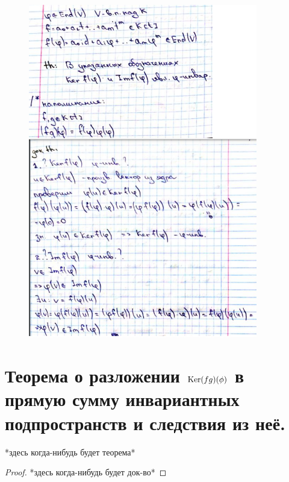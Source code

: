 \documentclass[algebra]{subfiles}
\begin{document}
    \begin{figure}[H]
            \includegraphics[width=10cm]{pics/56}
            \centering
    \end{figure}

    \section{Теорема о разложении $\mathop{\rm Ker}\nolimits(f g)(\phi)$ в прямую сумму инвариантных подпространств и следствия из неё.}

    \begin{theorem}
      *здесь когда-нибудь будет теорема*
    \end{theorem}

    \begin{proof}
      *здесь когда-нибудь будет док-во*
    \end{proof}
\end{document}
